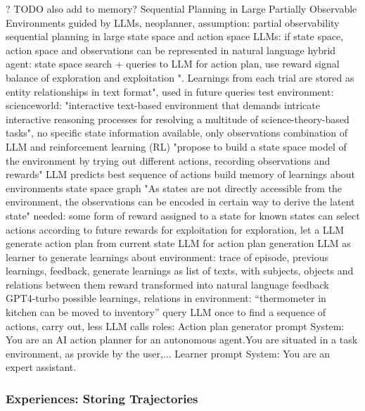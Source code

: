 \documentclass{article}
\begin{document}
? TODO also add to memory?
\cite{paul_sequential_2023} Sequential Planning in Large Partially Observable Environments guided by LLMs, neoplanner, 
assumption: partial observability
sequential planning in large state space and action space
LLMs: if state space, action space and observations can be represented in natural language
hybrid agent: state space search + queries to LLM for action plan, use reward signal
balance of exploration and exploitation
". Learnings from each trial are stored as entity relationships in text format", used in future queries
test environment: scienceworld: "interactive text-based environment that demands intricate interactive reasoning processes for resolving a multitude of science-theory-based tasks", no specific state information available, only observations
combination of LLM and reinforcement learning (RL)
"propose to build a state space model of the environment by trying out different actions, recording observations and rewards"
LLM predicts best sequence of actions
build memory of learnings about environments
state space graph
"As states are not directly accessible from the environment, the observations can be encoded in certain way to derive the latent state"
needed: some form of reward assigned to a state
for known states can select actions according to future rewards for exploitation
for exploration,  let a LLM generate action plan from current state
LLM for action plan generation
LLM as learner to generate learnings about environment: trace of episode, previous learnings, feedback, generate learnings as list of texts, with subjects, objects and relations between them
reward transformed into natural language feedback
GPT4-turbo
possible learnings, relations in environment: “thermometer in kitchen can be moved to inventory”
query LLM once to find a sequence of actions, carry out, less LLM calls
roles: Action plan generator prompt System: You are an AI action planner for an autonomous agent.You are situated in a task environment, as provide by the user,...
Learner prompt System: You are an expert assistant.

\subsubsection{Experiences: Storing Trajectories}
\end{document}
